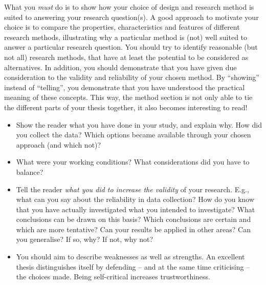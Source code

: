 What you \emph{must} do is to show how your choice of design and research method is suited to answering your research question(s). A good approach to motivate your choice is to compare the properties, characteristics and features of different research methods, illustrating why a particular method is (not) well suited to answer a particular research question. You should try to identify reasonable (but not all) research methods, that have at least the potential to be considered as alternatives. In addition, you should demonstrate that you have given due consideration to the validity and reliability of your chosen method. By ``showing'' instead of ``telling'', you demonstrate that you have understood the practical meaning of these concepts. This way, the method section is not only able to tie the different parts of your thesis together, it also becomes interesting to read!

\begin{itemize}
    \item Show the reader what you have done in your study, and explain why. How did you collect the data? Which options became available through your chosen approach (and which not)?
    \item What were your working conditions? What considerations did you have to balance?
    \item Tell the reader \emph{what you did to increase the validity} of
    your research. E.g., what can you say about the reliability in data
    collection? How do you know that you have actually investigated what you 
    intended to investigate? What conclusions can be drawn on this basis? 
    Which conclusions are certain and which are more tentative? Can your 
    results be applied in other areas? Can you generalise? If so, why? If 
    not, why not?
    \item You should aim to describe weaknesses as well as strengths. An excellent thesis distinguishes itself by defending -- and at the same time criticising -- the choices made. Being self-critical increases trustworthiness.
\end{itemize}